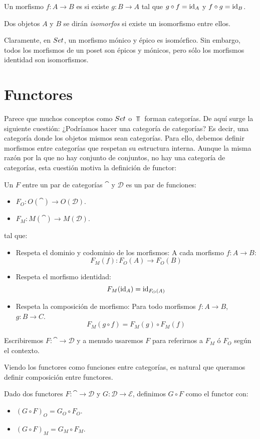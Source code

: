 \begin{definition}
Un morfismo $f \colon A \to B$ es  si existe $g \colon B \to A$ tal que $g \circ f = \operatorname{id}_A$ y $f \circ g = \operatorname{id}_B$.

Dos objetos $A$ y $B$ se dirán \emph{isomorfos} si existe un isomorfismo entre ellos.
\end{definition}

Claramente, en ${Set}$, un morfismo mónico y épico es isomórfico.
Sin embargo, todos los morfismos de un poset son épicos y mónicos, pero sólo los morfismos identidad son isomorfismos.

\section{Functores}
Parece que muchos conceptos como ${Set}$ o $\Top$ forman categorías.
De aquí surge la siguiente cuestión: ¿Podríamos hacer una categoría de categorías?
Es decir, una categoría donde los objetos mismos sean categorías.
Para ello, debemos definir morfismos entre categorías que respetan su estructura interna.
Aunque la misma razón por la que no hay conjunto de conjuntos, no hay una categoría de categorías, esta cuestión motiva la definición de functor:

\begin{definition}\label{def:functor}
Un  $F$ entre un par de categorías $\cat$ y $\mathcal{D}$ es un par de funciones:
\begin{itemize}
\item $F_O : O(\cat) \to O(\mathcal{D})$.
\item $F_M : M(\cat) \to M(\mathcal{D})$.
\end{itemize}
tal que:
\begin{itemize}
\item Respeta el dominio y codominio de los morfismos: A cada morfismo $f : A \to B$:
\[ F_M(f) : F_O(A) \to F_O(B) \]
\item Respeta el morfismo identidad:
\[ F_M(\operatorname{id}_A) = \operatorname{id}_{F_O(A)} \]
\item Respeta la composición de morfismo: Para todo morfismos $f : A \to B$, $g : B \to C$.
\[ F_M(g \circ f) = F_M(g) \circ F_M(f) \]
\end{itemize}
\end{definition}

Escribiremos $F \colon \cat \to \mathcal{D}$ y a menudo usaremos $F$ para referirnos a $F_M$ ó $F_O$ según el contexto.

Viendo los functores como funciones entre categorías, es natural que queramos definir composición entre functores.
\begin{definition}
Dado dos functores $F \colon \cat \to \mathcal{D}$ y $G \colon \mathcal{D} \to \mathcal{E}$, definimos $G \circ F$ como el functor con:
\begin{itemize}
  \item $(G \circ F)_O = G_O \circ F_O$.
  \item $(G \circ F)_M = G_M \circ F_M$.
\end{itemize}
\end{definition}
